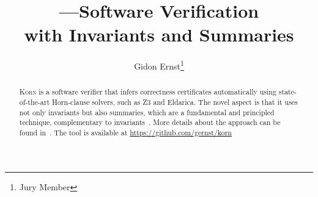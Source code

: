\documentclass{llncs}
\author{Gidon Ernst\thanks{Jury Member}}
\title{\Korn---Software Verification \\ with Invariants and Summaries}
\institute{LMU Munich \\ \mailto{gidon.ernst@lmu.de}}
\newcommand{\Korn}{\textsc{Korn}\xspace}
\begin{document}
\maketitle

\begin{abstract}
    \Korn is a software verifier that infers correctness certificates automatically using state-of-the-art Horn-clause solvers, such as Z3 and Eldarica.
    The novel aspect is that it uses not only invariants but also summaries, which are a fundamental and principled technique, complementary to invariants~\cite{hehner1999refinement,hehner2005specified,tuerk2010local}.
    More details about the approach can be found in~\cite{ernst:arxiv2020:summaries}.
    The tool is available at \url{https://github.com/gernst/korn}

\end{abstract}
\end{document}
